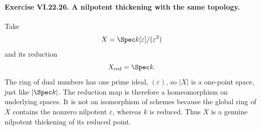 \paragraph{Exercise VI.22.26. A nilpotent thickening with the same topology.}
\begin{solution}
Take
\[
 X=\Spec k[\varepsilon]/(\varepsilon^2)
\]
and its reduction
\[
 X_{\mathrm{red}}=\Spec k.
\]
The ring of dual numbers has one prime ideal, $(\varepsilon)$, so $|X|$ is a one-point space,
just like $|\Spec k|$.  The reduction map is therefore a homeomorphism on underlying spaces.
It is not an isomorphism of schemes because the global ring of $X$ contains the nonzero
nilpotent $\varepsilon$, whereas $k$ is reduced.  Thus $X$ is a genuine nilpotent thickening
of its reduced point.
\end{solution}
